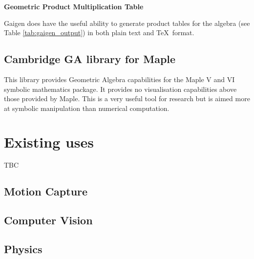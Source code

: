 \begin{table}
\centering
\textbf{Geometric Product Multiplication Table}\\
\rule{0cm}{0.3cm}

\caption{Example \TeX\ output from Gaigen\label{tab:gaigen_output}}
\end{table}

Gaigen does have the useful ability to generate product tables for the algebra
(see Table \ref{tab:gaigen_output}) in both plain text and \TeX\ format. 


\subsection{Cambridge GA library for Maple}

This library\cite{GA:CambridgeGALibrary} provides Geometric Algebra
capabilities for the Maple V and VI symbolic mathematics package. It provides
no visualisation capabilities above those provided by Maple. This is a very
useful tool for research but is aimed more at symbolic manipulation than
numerical computation.

\section{Existing uses}

TBC

\subsection{Motion Capture}
\subsection{Computer Vision}
\subsection{Physics}
